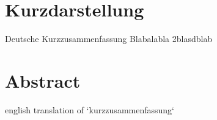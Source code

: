 \thispagestyle{empty}
\section*{Kurzdarstellung}
\label{sec:kurzdarstellung}

Deutsche Kurzzusammenfassung
Blabalabla \cite{Kuhnapfel.2019}
2blasdblab \cite{Rogers.2011}


\section*{Abstract}
\label{sec:abstract}
english translation of `kurzzusammenfassung`

\blindtext
